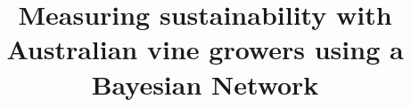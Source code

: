 

%
\title{Measuring sustainability with Australian vine growers using a Bayesian Network}







%




%





